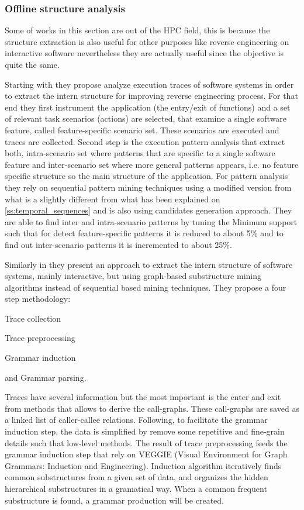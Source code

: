 \subsubsection{Offline structure analysis}

Some of works in this section are out of the HPC field,
this is because the structure extraction is also useful for other purposes like
reverse engineering on interactive software nevertheless they are actually useful
since the objective is quite the same.

Starting with \cite{Safyallah2006} they propose analyze execution
traces of software systems in order to extract the intern structure for
improving reverse engineering process. For
that end they first instrument the application (the entry/exit of functions) and 
a set of relevant task scenarios (actions) are selected, that examine a 
single software feature, called feature-specific scenario set. These scenarios
are executed and traces are collected. Second step is the execution pattern
analysis that extract both, intra-scenario set where patterns that are specific
to a single software feature and inter-scenario set where more general
patterns appears, i.e. no feature specific structure so the main structure of 
the application. For pattern analysis they rely on sequential pattern mining
techniques using a modified version from \cite{Agrawal_seqpatt} what is a
slightly different from what has been explained on \ref{ss:temporal_sequences} 
and is also using candidates generation approach. They are able to find inter
and intra-scenario patterns by tuning the Minimum support such that for detect
feature-specific patterns it is reduced to about 5\% and to find out
inter-scenario patterns it is incremented to about 25\%.

Similarly in \cite{Zhao2008} they present an approach to extract the intern
structure of software systems, mainly interactive, but using graph-based 
substructure mining algorithms instead of sequential based mining techniques.
They propose a four step methodology: 
\begin{enumerate*}[label=\roman*)]
  \item Trace collection
  \item Trace preprocessing
  \item Grammar induction
  \item and Grammar parsing.
\end{enumerate*}
Traces have several information but the most important is the enter and exit
from methods that allows to derive the call-graphs. These call-graphs are saved
as a linked list of caller-callee relations. Following, to facilitate the
grammar induction step, the data is simplified by remove some repetitive and
fine-grain details such that low-level methods. The
result of trace preprocessing feeds the grammar induction step that rely on
VEGGIE (Visual Environment for Graph Grammars: Induction and Engineering). 
Induction algorithm iteratively finds common substructures from a
given set of data, and organizes the hidden hierarchical substructures in a
gramatical way. When a common frequent substructure is found, a grammar
production will be created.

